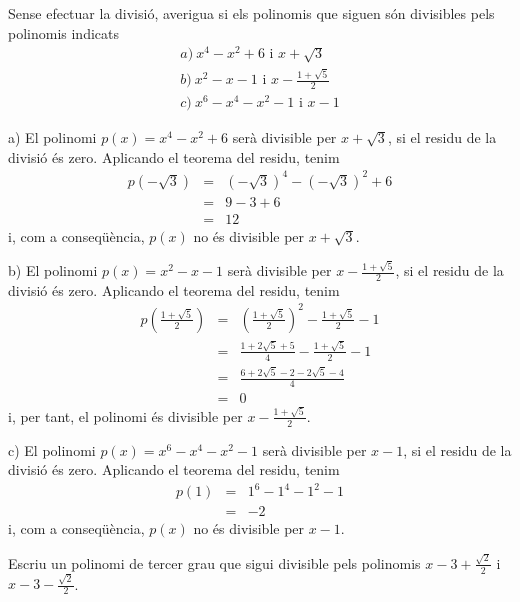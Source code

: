 \begin{exercici}
Sense efectuar la divisió, averigua si els polinomis que siguen són
divisibles pels polinomis indicats\[
\begin{array}{l}
a)~x^{4}-x^{2}+6\text{ i }x+\sqrt{3} \\
b)~x^{2}-x-1\text{ i }x-\frac{1+\sqrt{5}}{2} \\
c)~x^{6}-x^{4}-x^{2}-1\text{ i }x-1\end{array}\]
\end{exercici}

\begin{solucio}
a) El polinomi $p(x)=x^{4}-x^{2}+6$ serà divisible per $x+\sqrt{3}$, si
el residu de la divisió és zero. Aplicando el teorema del residu, tenim\begin{eqnarray*}
p\left( -\sqrt{3}\right) &=&\left( -\sqrt{3}\right) ^{4}-\left( -\sqrt{3}\right) ^{2}+6 \\
&=&9-3+6 \\
&=&12
\end{eqnarray*}i, com a conseqüència, $p(x)$ no és divisible per $x+\sqrt{3}$.

b) El polinomi $p(x)=x^{2}-x-1$ serà divisible per $x-\frac{1+\sqrt{5}}{2}$, si el residu de la divisió és zero. Aplicando el teorema del residu,
tenim\begin{eqnarray*}
p\left( \frac{1+\sqrt{5}}{2}\right) &=&\left( \frac{1+\sqrt{5}}{2}\right)
^{2}-\frac{1+\sqrt{5}}{2}-1 \\
&=&\frac{1+2\sqrt{5}+5}{4}-\frac{1+\sqrt{5}}{2}-1 \\
&=&\frac{6+2\sqrt{5}-2-2\sqrt{5}-4}{4} \\
&=&0
\end{eqnarray*}i, per tant, el polinomi és divisible per $x-\frac{1+\sqrt{5}}{2}$.

c) El polinomi $p(x)=x^{6}-x^{4}-x^{2}-1$ serà divisible per $x-1$, si
el residu de la divisió és zero. Aplicando el teorema del residu, tenim\begin{eqnarray*}
p(1) &=&1^{6}-1^{4}-1^{2}-1 \\
&=&-2
\end{eqnarray*}i, com a conseqüència, $p(x)$ no és divisible per $x-1$.
\end{solucio}

\begin{exercici}
Escriu un polinomi de tercer grau que sigui divisible pels polinomis $x-3+\frac{\sqrt{2}}{2}$ i $x-3-\frac{\sqrt{2}}{2}$.
\end{exercici}

